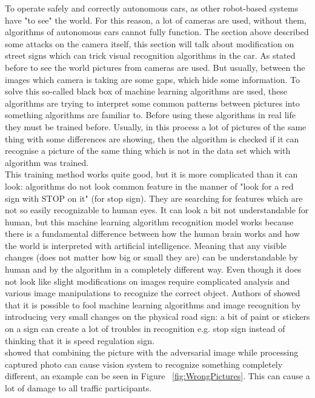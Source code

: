 To operate safely and correctly autonomous cars, as other robot-based systems have "to see" the world. For this reason, a lot of cameras are used, without them, algorithms of autonomous cars cannot fully function. The section above described some attacks on the camera itself, this section will talk about modification on street signs which can trick visual recognition algorithms in the car. As stated before to see the world pictures from cameras are used. But usually, between the images which camera is taking are some gaps, which hide some information. To solve this so-called black box of machine learning algorithms are used, these algorithms are trying to interpret some common patterns between pictures into something algorithms are familiar to. Before using these algorithms in real life they must be trained before. Usually, in this process a lot of pictures of the same thing with some differences are showing, then the algorithm is checked if it can recognise a picture of the same thing which is not in the data set which with algorithm was trained. \\
This training method works quite good, but it is more complicated than it can look: algorithms do not look common feature in the manner of "look for a red sign with STOP on it" (for stop sign). They are searching for features which are not so easily recognizable to human eyes. It can look a bit not understandable for human, but this machine learning algorithm recognition model works because there is a fundamental difference between how the human brain works and how the world is interpreted with artificial intelligence. Meaning that any visible changes (does not matter how big or small they are) can be understandable by human and by the algorithm in a completely different way. Even though it does not look like slight modifications on images require complicated analysis and various image manipulations to recognize the correct object. Authors of \cite{blackBox1} showed that it is possible to fool machine learning algorithms and image recognition by introducing very small changes on the physical road sign: a bit of paint or stickers on a sign can create a lot of troubles in recognition e.g. stop sign instead of thinking that it is speed regulation sign. \\
\cite{blackBox1} showed that combining the picture with the adversarial image while processing captured photo can cause vision system to recognize something completely different, an example can be seen in Figure ~\ref{fig:WrongPictures}. This can cause a lot of damage to all traffic participants. 

